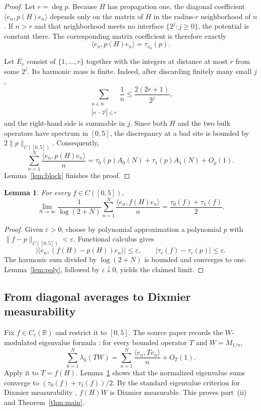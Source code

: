 \documentclass[11pt]{article}
\newtheorem{lemma}{Lemma}
\newcommand{\N}{\mathbb N}
\newcommand{\R}{\mathbb R}
\newcommand{\ip}[2]{\langle #1,#2\rangle}
\begin{document}
\begin{proof}
Let $r=\deg p$.  Because $H$ has propagation one, the diagonal coefficient
$\ip{e_n}{p(H)e_n}$ depends only on the matrix of $H$ in the radius-$r$
neighborhood of $n$.  If $n>r$ and that neighborhood meets no interface
$\{2^j:j\geq0\}$, the potential is constant there.  The corresponding matrix
coefficient is therefore exactly
\[
 \ip{e_n}{p(H)e_n}=\tau_{v_n}(p).
\]

Let $E_r$ consist of $\{1,\ldots,r\}$ together with the integers at distance
at most $r$ from some $2^j$.  Its harmonic mass is finite.  Indeed, after
discarding finitely many small $j$,
\[
 \sum_{\substack{n\in\N\\|n-2^j|\leq r}}\frac1n
 \leq \frac{2(2r+1)}{2^j},
\]
and the right-hand side is summable in $j$.  Since both $H$ and the two bulk
operators have spectrum in $[0,5]$, the discrepancy at a bad site is bounded
by $2\|p\|_{C([0,5])}$.  Consequently,
\[
 \sum_{n=1}^N\frac{\ip{e_n}{p(H)e_n}}n
 =\tau_0(p)A_0(N)+\tau_1(p)A_1(N)+O_p(1).
\]
Lemma~\ref{lem:block} finishes the proof.
\end{proof}

\begin{lemma}\label{lem:continuous}
For every $f\in C([0,5])$,
\[
 \lim_{N\to\infty}\frac1{\log(2+N)}
 \sum_{n=1}^N\frac{\ip{e_n}{f(H)e_n}}n
 =\frac{\tau_0(f)+\tau_1(f)}2.
\]
\end{lemma}

\begin{proof}
Given $\varepsilon>0$, choose by polynomial approximation a polynomial $p$
with $\|f-p\|_{C([0,5])}<\varepsilon$.  Functional calculus gives
\[
 \big|\ip{e_n}{(f(H)-p(H))e_n}\big|\leq\varepsilon,
 \qquad
 |\tau_c(f)-\tau_c(p)|\leq\varepsilon.
\]
The harmonic sum divided by $\log(2+N)$ is bounded and converges to one.
Lemma~\ref{lem:poly}, followed by $\varepsilon\downarrow0$, yields the claimed
limit.
\end{proof}

\subsection{From diagonal averages to Dixmier measurability}

Fix $f\in C_c(\R)$ and restrict it to $[0,5]$.  The source paper records the
$W$-modulated eigenvalue formula \cite[Theorem~4.5]{AHMSZ}: for every bounded
operator $T$ and $W=M_{1/n}$,
\[
 \sum_{k=1}^N\lambda_k(TW)
 =\sum_{n=1}^N\frac{\ip{e_n}{Te_n}}n+O_T(1).
\]
Apply it to $T=f(H)$.  Lemma~\ref{lem:continuous} shows that the normalized
eigenvalue sums converge to
$(\tau_0(f)+\tau_1(f))/2$.  By the standard eigenvalue criterion for Dixmier
measurability \cite[Theorem~9.1.2(c)]{LSZ}, $f(H)W$ is Dixmier measurable.
This proves part~\textup{(ii)} and Theorem~\ref{thm:main}.
\end{document}
